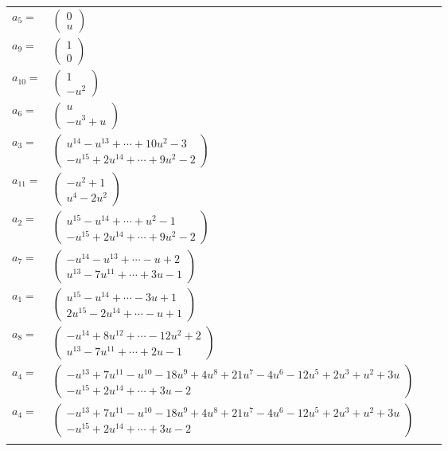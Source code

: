 \documentclass[1p]{elsarticle_modified}
\theoremstyle{definition}
\begin{document}
\begin{tabular}{m{7pt} m{180pt} m{7pt} m{180pt} }
\flushright $a_{5}=$&$\begin{pmatrix}0\\u\end{pmatrix}$ \\
\flushright $a_{9}=$&$\begin{pmatrix}1\\0\end{pmatrix}$ \\
\flushright $a_{10}=$&$\begin{pmatrix}1\\- u^2\end{pmatrix}$ \\
\flushright $a_{6}=$&$\begin{pmatrix}u\\- u^3+u\end{pmatrix}$ \\
\flushright $a_{3}=$&$\begin{pmatrix}u^{14}- u^{13}+\cdots+10 u^2-3\\- u^{15}+2 u^{14}+\cdots+9 u^2-2\end{pmatrix}$ \\
\flushright $a_{11}=$&$\begin{pmatrix}- u^2+1\\u^4-2 u^2\end{pmatrix}$ \\
\flushright $a_{2}=$&$\begin{pmatrix}u^{15}- u^{14}+\cdots+u^2-1\\- u^{15}+2 u^{14}+\cdots+9 u^2-2\end{pmatrix}$ \\
\flushright $a_{7}=$&$\begin{pmatrix}- u^{14}- u^{13}+\cdots- u+2\\u^{13}-7 u^{11}+\cdots+3 u-1\end{pmatrix}$ \\
\flushright $a_{1}=$&$\begin{pmatrix}u^{15}- u^{14}+\cdots-3 u+1\\2 u^{15}-2 u^{14}+\cdots- u+1\end{pmatrix}$ \\
\flushright $a_{8}=$&$\begin{pmatrix}- u^{14}+8 u^{12}+\cdots-12 u^2+2\\u^{13}-7 u^{11}+\cdots+2 u-1\end{pmatrix}$ \\
\flushright $a_{4}=$&$\begin{pmatrix}- u^{13}+7 u^{11}- u^{10}-18 u^9+4 u^8+21 u^7-4 u^6-12 u^5+2 u^3+u^2+3 u\\- u^{15}+2 u^{14}+\cdots+3 u-2\end{pmatrix}$\\ \flushright $a_{4}=$&$\begin{pmatrix}- u^{13}+7 u^{11}- u^{10}-18 u^9+4 u^8+21 u^7-4 u^6-12 u^5+2 u^3+u^2+3 u\\- u^{15}+2 u^{14}+\cdots+3 u-2\end{pmatrix}$\\&\end{tabular}
\end{document}
